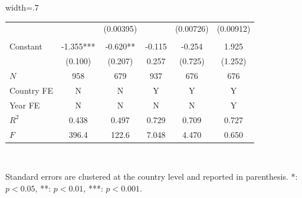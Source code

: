 \documentclass{article}
\begin{document}
\begin{table}[hp!]
\begin{adjustbox}{width=.7\textwidth}
\begin{tabular}{l|ccccc|}
\multicolumn{1}{|l|}{}            &                                  & (0.00395)                         &                                 & (0.00726) & (0.00912)  \\
\multicolumn{1}{|l|}{}            &       &    &           & &   \\
\multicolumn{1}{|l|}{Constant}      & -1.355*** & -0.620** & -0.115                          & -0.254  & 1.925    \\
\multicolumn{1}{|l|}{}            & (0.100)                            & (0.207)                           & 0.257                           & (0.725)   & (1.252)   \\ \hline
\multicolumn{1}{|l|}{$N$}           & 958                              & 679                             & 937                             & 676     & 676      \\
\multicolumn{1}{|l|}{Country FE}           & N &  N  &   Y   & Y  & Y    \\
\multicolumn{1}{|l|}{Year FE}           & N &  N  &   N   & N  & Y    \\
\multicolumn{1}{|l|}{$R^2$}          & 0.438                            & 0.497                           & 0.729                           & 0.709   & 0.727    \\
\multicolumn{1}{|l|}{$F$}           & 396.4                            & 122.6                           & 7.048                           & 4.470   & 0.650    \\ \hline
\end{tabular}
\end{adjustbox}
\\[1em]
\begin{minipage}{\textwidth} %
\footnotesize{Standard errors are clustered at the country level and reported in parenthesis. *: $p<0.05$, **: $p<0.01$, ***: $p<0.001$. \par}
\end{minipage}
\end{table}
\end{document}
